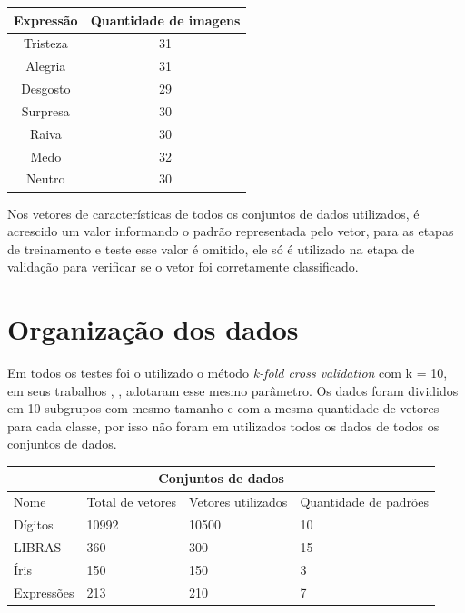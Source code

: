 \begin{itemize}
\begin{center}
	\begin{tabular}{cc}
        \hline
        Expressão & Quantidade de imagens \\
        \hline
		Tristeza & 31 \\
		Alegria & 31 \\
		Desgosto & 29 \\
		Surpresa & 30 \\
		Raiva & 30 \\
		Medo & 32 \\
		Neutro & 30 \\
        \hline
	\end{tabular}
        \label{tab:tabela_expressoes}
\end{center}
\end{itemize}

Nos vetores de características de todos os conjuntos de dados utilizados, é acrescido um valor informando o padrão representada pelo vetor, para as etapas de treinamento e teste esse valor é omitido, ele só é utilizado na etapa de validação para verificar se o vetor foi corretamente classificado.

\section{Organização dos dados}
Em todos os testes foi o utilizado o método \textit{k-fold cross validation} com k = 10, em seus trabalhos , ,  adotaram esse mesmo parâmetro. Os dados foram divididos em 10 subgrupos com mesmo tamanho \cite{Guo} e com a mesma quantidade de vetores para cada classe, por isso não foram em utilizados todos os dados de todos os conjuntos de dados.
\newpage
\begin{center}
	\begin{tabular}{|p{2cm}|p{3cm}|p{2cm}|p{2cm}|}
        \hline
        \multicolumn{4}{|c|}{Conjuntos de dados} \\ \hline
        Nome & Total de vetores & Vetores utilizados & Quantidade de padrões\\ \hline
		Dígitos    &10992  & 10500 & 10\\ \hline
		LIBRAS     & 360   & 300   & 15\\ \hline
		Íris       & 150   & 150   & 3\\ \hline
		Expressões & 213   & 210   & 7\\ \hline
	\end{tabular}
	\label{table:org_dados}
\end{center}

